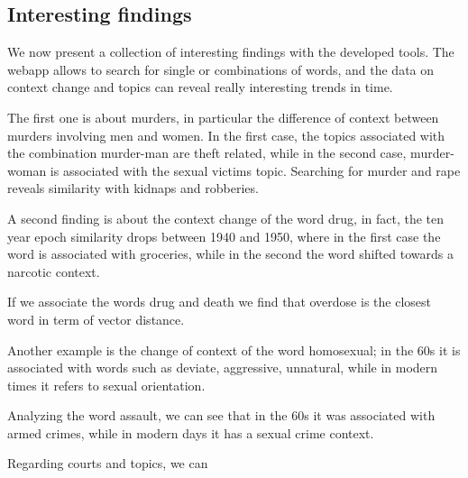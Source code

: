 \subsection{Interesting findings}
\label{sec:Interesting findings}

We now present a collection of interesting findings with the developed tools.
The webapp allows to search for single or combinations of words, and the data on context change and topics can 
reveal really interesting trends in time. 

The first one is about murders, in particular the difference of context between murders involving men and 
women. In the first case, the topics associated with the combination murder-man are theft related, while in the 
second case, murder-woman is associated with the sexual victims topic. Searching for murder and rape reveals 
similarity with kidnaps and robberies. 

A second finding is about the context change of the word drug, in fact, the ten year epoch similarity 
drops between 1940 and 1950, where in the first case the word is associated with groceries, while in the
second the word shifted towards a narcotic context.

If we associate the words drug and death we find that overdose is the closest word in term of vector distance.

Another example is the change of context of the word homosexual; in the 60s it is associated with words such as
deviate, aggressive, unnatural, while in modern times it refers to sexual orientation.

Analyzing the word assault, we can see that in the 60s it was associated with armed crimes, 
while in modern days it has a sexual crime context.

Regarding courts and topics, we can 